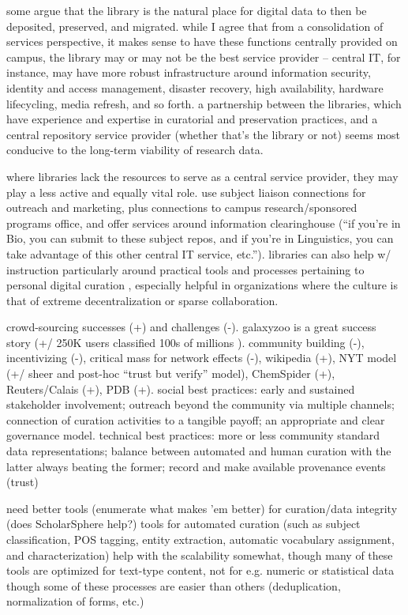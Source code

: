 \documentclass{acm_proc_article-sp}
\begin{document}
some \cite{heidorn:libraries} argue that the library is the natural
place for digital data to then be deposited, preserved, and
migrated. while I agree that from a consolidation of services
perspective, it makes sense to have these functions centrally provided
on campus, the library may or may not be the best service provider --
central IT, for instance, may have more robust infrastructure around
information security, identity and access management, disaster
recovery, high availability, hardware lifecycling, media refresh, and
so forth. a partnership between the libraries, which have experience
and expertise in curatorial and preservation practices, and a central
repository service provider (whether that's the library or not) seems
most conducive to the long-term viability of research data.

where libraries lack the resources to serve as a central service
provider, they may play a less active and equally vital role. use
subject liaison connections for outreach and marketing, plus
connections to campus research/sponsored programs office, and offer
services around information clearinghouse (``if you're in Bio, you can
submit to these subject repos, and if you're in Linguistics, you can
take advantage of this other central IT service, etc.''). libraries
can also help w/ instruction particularly around practical tools and
processes pertaining to personal digital curation
\cite{williams:lifecycle}, especially helpful in organizations where
the culture is that of extreme decentralization or sparse
collaboration.

crowd-sourcing successes (+) and challenges (-). galaxyzoo is a great
success story (+/ 250K users classified 100s of millions
\cite{adams:galaxyzoo}). community building (-), incentivizing (-),
critical mass for network effects (-), wikipedia (+), NYT model (+/
sheer and post-hoc ``trust but verify'' model), ChemSpider (+),
Reuters/Calais (+), PDB (+).  social best
practices\cite{curry:community}: early and sustained stakeholder
involvement; outreach beyond the community via multiple channels;
connection of curation activities to a tangible payoff; an appropriate
and clear governance model. technical best practices: more or less
community standard data representations; balance between automated and
human curation with the latter always beating the former; record and
make available provenance events (trust)

need better tools (enumerate what makes 'em better) for curation/data
integrity (does ScholarSphere help?) tools for automated curation
(such as subject classification, POS tagging, entity extraction,
automatic vocabulary assignment, and characterization) help with the
scalability somewhat, though many of these tools are optimized for
text-type content, not for e.g. numeric or statistical data though
some of these processes are easier than others (deduplication,
normalization of forms, etc.)
\end{document}
